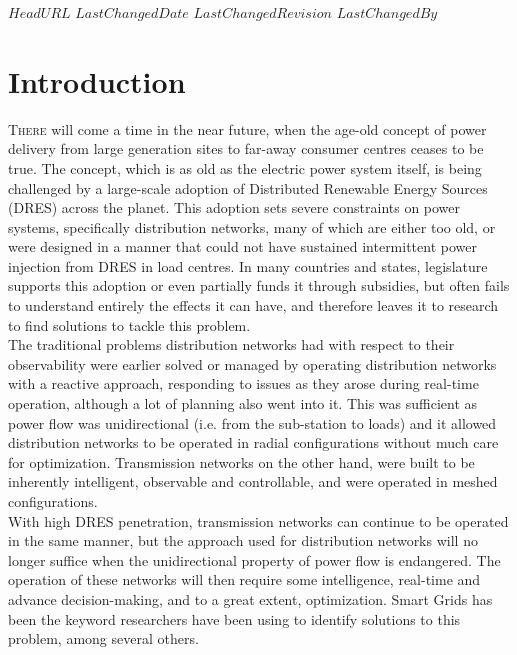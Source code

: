 \svnidlong
{$HeadURL$}
{$LastChangedDate$}
{$LastChangedRevision$}
{$LastChangedBy$}

\chapter{Introduction}

\lettrine[findent=0pt, nindent=0pt]{T}{here} will come a time in the near future, when the age-old concept of power delivery from large generation sites to far-away consumer centres ceases to be true. The concept, which is as old as the electric power system itself, is being challenged by a large-scale adoption of Distributed Renewable Energy Sources (DRES) across the planet. This adoption sets severe constraints on power systems, specifically distribution networks, many of which are either too old, or were designed in a manner that could not have sustained intermittent power injection from DRES in load centres. In many countries and states, legislature supports this adoption or even partially funds it through subsidies, but often fails to understand entirely the effects it can have, and therefore leaves it to research to find solutions to tackle this problem.\\

The traditional problems distribution networks had with respect to their observability were earlier solved or managed by operating distribution networks with a reactive approach, responding to issues as they arose during real-time operation, although a lot of planning also went into it. This was sufficient as power flow was unidirectional (i.e. from the sub-station to loads) and it allowed distribution networks to be operated in radial configurations without much care for optimization. Transmission networks on the other hand, were built to be inherently intelligent, observable and controllable, and were operated in meshed configurations.\\

With high DRES penetration, transmission networks can continue to be operated in the same manner, but the approach used for distribution networks will no longer suffice when the unidirectional property of power flow is endangered. The operation of these networks will then require some intelligence, real-time and advance decision-making, and to a great extent, optimization. Smart Grids has been the keyword researchers have been using to identify solutions to this problem, among several others.\\


